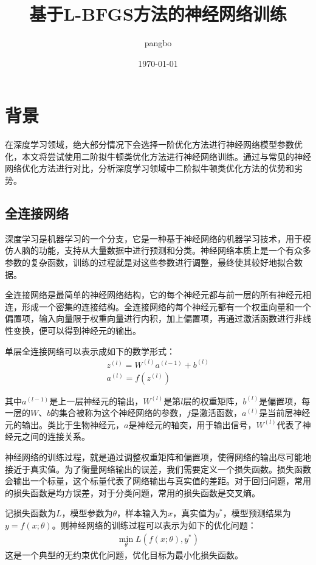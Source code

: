 \documentclass{article}
\title{基于L-BFGS方法的神经网络训练} %
\author{pangbo} %
\date{\today} %
\begin{document}
\maketitle %


\section{背景} %

在深度学习领域，绝大部分情况下会选择一阶优化方法进行神经网络模型参数优化，本文将尝试使用二阶拟牛顿类优化方法进行神经网络训练。通过与常见的神经网络优化方法进行对比，分析深度学习领域中二阶拟牛顿类优化方法的优势和劣势。

\subsection{全连接网络}

深度学习是机器学习的一个分支，它是一种基于神经网络的机器学习技术，用于模仿人脑的功能，支持从大量数据中进行预测和分类。神经网络本质上是一个有众多参数的复杂函数，训练的过程就是对这些参数进行调整，最终使其较好地拟合数据。

全连接网络是最简单的神经网络结构，它的每个神经元都与前一层的所有神经元相连，形成一个密集的连接结构。全连接网络的每个神经元都有一个权重向量和一个偏置项，输入向量限于权重向量进行内积，加上偏置项，再通过激活函数进行非线性变换，便可以得到神经元的输出。

单层全连接网络可以表示成如下的数学形式：
\begin{align*}
z^{(l)} = W^{(l)}a^{(l-1)} + b^{(l)}\\
a^{(l)} = f(z^{(l)})
\end{align*}

其中$a^{(l-1)}$是上一层神经元的输出，$W^{(l)}$是第$l$层的权重矩阵，$b^{(l)}$是偏置项，每一层的$W$、$b$的集合被称为这个神经网络的参数，$f$是激活函数，$a^{(l)}$是当前层神经元的输出。类比于生物神经元，$a$是神经元的轴突，用于输出信号，$W^{(l)}$代表了神经元之间的连接关系。

神经网络的训练过程，就是通过调整权重矩阵和偏置项，使得网络的输出尽可能地接近于真实值。为了衡量网络输出的误差，我们需要定义一个损失函数。损失函数会输出一个标量，这个标量代表了网络输出与真实值的差距。对于回归问题，常用的损失函数是均方误差，对于分类问题，常用的损失函数是交叉熵。

记损失函数为$L$，模型参数为$\theta$，样本输入为$x$，真实值为$y^*$，模型预测结果为$y=f(x;\theta)$。则神经网络的训练过程可以表示为如下的优化问题：
\begin{align*}
\min_{\theta} L(f(x;\theta), y^*)
\end{align*}
这是一个典型的无约束优化问题，优化目标为最小化损失函数。
\end{document}
